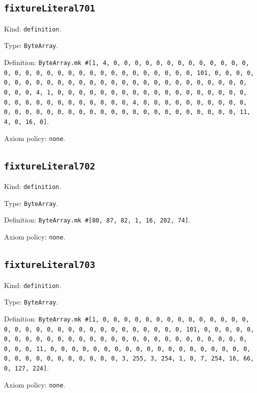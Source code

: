 \documentclass[11pt]{article}
\begin{document}
\subsection*{\texttt{fixtureLiteral701}}
\noindent Kind: \texttt{definition}.\par
\noindent Type: \texttt{ByteArray}.\par
\noindent Definition: \texttt{ByteArray.mk \#[1, 4, 0, 0, 0, 0, 0, 0, 0, 0, 0, 0, 0, 0, 0, 0, 0, 0, 0, 0, 0, 0, 0, 0, 0, 0, 0, 0, 0, 0, 0, 0, 0, 101, 0, 0, 0, 0, 0, 0, 0, 0, 0, 0, 0, 0, 0, 0, 0, 0, 0, 0, 0, 0, 0, 0, 0, 0, 0, 0, 0, 0, 0, 0, 4, 1, 0, 0, 0, 0, 0, 0, 0, 0, 0, 0, 0, 0, 0, 0, 0, 0, 0, 0, 0, 0, 0, 0, 0, 0, 0, 0, 0, 0, 0, 0, 4, 0, 0, 0, 0, 0, 0, 0, 0, 0, 0, 0, 0, 0, 0, 0, 0, 0, 0, 0, 0, 0, 0, 0, 0, 0, 0, 0, 0, 0, 0, 0, 0, 11, 4, 0, 16, 0]}.\par
\noindent Axiom policy: \texttt{none}.\par
\subsection*{\texttt{fixtureLiteral702}}
\noindent Kind: \texttt{definition}.\par
\noindent Type: \texttt{ByteArray}.\par
\noindent Definition: \texttt{ByteArray.mk \#[80, 87, 82, 1, 16, 202, 74]}.\par
\noindent Axiom policy: \texttt{none}.\par
\subsection*{\texttt{fixtureLiteral703}}
\noindent Kind: \texttt{definition}.\par
\noindent Type: \texttt{ByteArray}.\par
\noindent Definition: \texttt{ByteArray.mk \#[1, 0, 0, 0, 0, 0, 0, 0, 0, 0, 0, 0, 0, 0, 0, 0, 0, 0, 0, 0, 0, 0, 0, 0, 0, 0, 0, 0, 0, 0, 0, 0, 101, 0, 0, 0, 0, 0, 0, 0, 0, 0, 0, 0, 0, 0, 0, 0, 0, 0, 0, 0, 0, 0, 0, 0, 0, 0, 0, 0, 0, 0, 0, 0, 11, 0, 0, 0, 0, 0, 0, 0, 0, 0, 0, 0, 0, 0, 0, 0, 0, 0, 0, 0, 0, 0, 0, 0, 0, 0, 0, 0, 0, 0, 0, 3, 255, 3, 254, 1, 0, 7, 254, 16, 66, 0, 127, 224]}.\par
\noindent Axiom policy: \texttt{none}.\par
\end{document}
